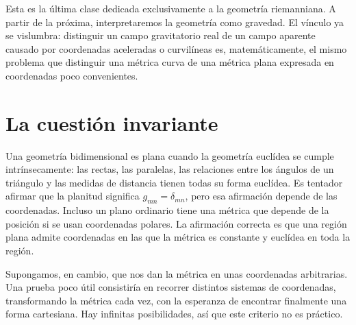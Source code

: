 \begin{classroomqa}
\end{classroomqa}

Esta es la última clase dedicada exclusivamente a la geometría riemanniana. A partir de la próxima, interpretaremos la geometría como gravedad. El vínculo ya se vislumbra: distinguir un campo gravitatorio real de un campo aparente causado por coordenadas aceleradas o curvilíneas es, matemáticamente, el mismo problema que distinguir una métrica curva de una métrica plana expresada en coordenadas poco convenientes.

\section{La cuestión invariante}

Una geometría bidimensional es plana cuando la geometría euclídea se cumple intrínsecamente: las rectas, las paralelas, las relaciones entre los ángulos de un triángulo y las medidas de distancia tienen todas su forma euclídea. Es tentador afirmar que la planitud significa \(g_{mn}=\delta_{mn}\), pero esa afirmación depende de las coordenadas. Incluso un plano ordinario tiene una métrica que depende de la posición si se usan coordenadas polares. La afirmación correcta es que una región plana admite coordenadas en las que la métrica es constante y euclídea en toda la región.

Supongamos, en cambio, que nos dan la métrica en unas coordenadas arbitrarias. Una prueba poco útil consistiría en recorrer distintos sistemas de coordenadas, transformando la métrica cada vez, con la esperanza de encontrar finalmente una forma cartesiana. Hay infinitas posibilidades, así que este criterio no es práctico.

